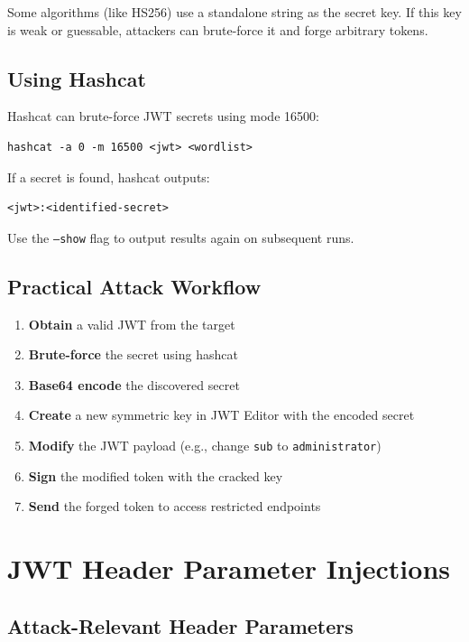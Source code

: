 \documentclass{article}
\begin{document}
Some algorithms (like HS256) use a standalone string as the secret key. If this key is weak or guessable, attackers can brute-force it and forge arbitrary tokens.

\subsection{Using Hashcat}

Hashcat can brute-force JWT secrets using mode 16500:

\begin{lstlisting}[caption=Hashcat Command]
hashcat -a 0 -m 16500 <jwt> <wordlist>
\end{lstlisting}

If a secret is found, hashcat outputs:
\begin{verbatim}
<jwt>:<identified-secret>
\end{verbatim}

\begin{notebox}[Note]
Use the \texttt{--show} flag to output results again on subsequent runs.
\end{notebox}

\subsection{Practical Attack Workflow}

\begin{enumerate}
    \item \textbf{Obtain} a valid JWT from the target
    \item \textbf{Brute-force} the secret using hashcat
    \item \textbf{Base64 encode} the discovered secret
    \item \textbf{Create} a new symmetric key in JWT Editor with the encoded secret
    \item \textbf{Modify} the JWT payload (e.g., change \texttt{sub} to \texttt{administrator})
    \item \textbf{Sign} the modified token with the cracked key
    \item \textbf{Send} the forged token to access restricted endpoints
\end{enumerate}

\section{JWT Header Parameter Injections}

\subsection{Attack-Relevant Header Parameters}
\end{document}
